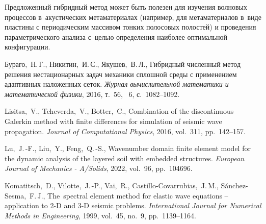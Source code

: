 \documentclass[press]{vestnik}
\begin{document}
Предложенный гибридный метод может быть полезен для изучения волновых процессов в~акустических метаматериалах (например, для метаматериалов в~виде пластины с периодическим массивом тонких полосовых полостей) \cite{Golub_2023} и проведения параметрического анализа с~целью определения наиболее оптимальной конфигурации.



%
%
\begin{thebibliography}{23}

%

Бураго,~Н.\,Г., Никитин,~И.\,С., Якушев,~В.\,Л., Гибридный численный метод решения нестационарных задач механики сплошной среды с применением адаптивных наложенных сеток. \emph{Журнал вычислительной математики и математической физики}, 2016, т.~56, \No~6, с.~1082--1092.  

Lisitsa,~V., Tcheverda,~V., Botter,~C., Combination of the discontinuous Galerkin method with finite differences for simulation of seismic wave propagation. \emph{Journal of Computational Physics}, 2016, vol.~311, pp.~142--157. 

Lu,~J.\,-F., Liu,~Y., Feng,~Q.\,-S., Wavenumber domain finite element model for the dynamic analysis of the layered soil with embedded structures. \emph{European Journal of Mechanics - A/Solids}, 2022, vol.~96, pp.~104696. 

Komatitsch,~D., Vilotte,~J.\,-P., Vai,~R., Castillo-Covarrubias,~J.\,M., Sánchez-Sesma,~F.\,J., The~spectral element method for elastic wave equations – application to 2-D and 3-D seismic problems. \emph{International Journal for Numerical Methods in Engineering}, 1999, vol.~45, no.~9, pp.~1139--1164. 


\end{thebibliography}
\end{document}
